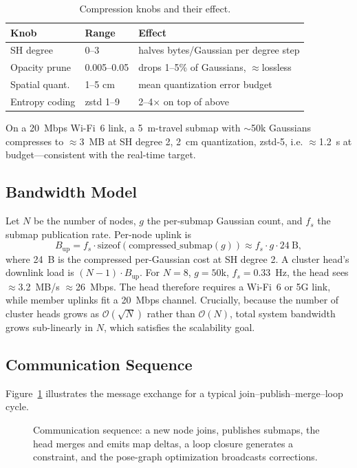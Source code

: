 \begin{table}[t]
  \centering
  \caption{Compression knobs and their effect.}
  \label{tab:knobs}
  \small
  \begin{tabular}{lll}
    \toprule
    Knob & Range & Effect \\
    \midrule
    SH degree        & 0--3      & halves bytes/Gaussian per degree step \\
    Opacity prune    & 0.005--0.05 & drops 1--5\% of Gaussians, $\approx$lossless \\
    Spatial quant.   & 1--5 cm   & mean quantization error budget \\
    Entropy coding   & zstd 1--9 & 2--4$\times$ on top of above \\
    \bottomrule
  \end{tabular}
\end{table}

On a 20~Mbps Wi-Fi~6 link, a 5~m-travel submap with $\sim$50k Gaussians
compresses to $\approx$3~MB at SH degree 2, 2~cm quantization, zstd-5, i.e.
$\approx$1.2~s at budget---consistent with the real-time target.

\subsection{Bandwidth Model}
\label{sec:bandwidth}

Let $N$ be the number of nodes, $g$ the per-submap Gaussian count, and $f_s$
the submap publication rate. Per-node uplink is
\begin{equation}
  B_{\text{up}} = f_s \cdot \text{sizeof}(\text{compressed\_submap}(g)) \approx f_s \cdot g \cdot 24~\text{B},
\end{equation}
where 24~B is the compressed per-Gaussian cost at SH degree 2. A cluster head's
downlink load is $(N-1) \cdot B_{\text{up}}$. For $N=8$, $g=50$k, $f_s=0.33$~Hz,
the head sees $\approx$3.2~MB/s $\approx$26~Mbps. The head therefore requires a
Wi-Fi~6 or 5G link, while member uplinks fit a 20~Mbps channel. Crucially,
because the number of cluster heads grows as $\mathcal{O}(\sqrt{N})$ rather
than $\mathcal{O}(N)$, total system bandwidth grows sub-linearly in $N$, which
satisfies the scalability goal.

\subsection{Communication Sequence}
\label{sec:sequence}

Figure~\ref{fig:sequence} illustrates the message exchange for a typical
join--publish--merge--loop cycle.

\begin{figure}[t]
  \centering
  \resizebox{\columnwidth}{!}{}
  \caption{Communication sequence: a new node joins, publishes submaps, the
  head merges and emits map deltas, a loop closure generates a constraint, and
  the pose-graph optimization broadcasts corrections.}
  \label{fig:sequence}
\end{figure}
